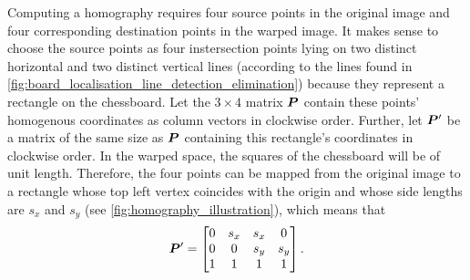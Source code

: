 \documentclass[../report.tex]{subfiles}
\begin{document}
Computing a homography requires four source points in the original image and four corresponding destination points in the warped image.
It makes sense to choose the source points as four instersection points lying on two distinct horizontal and two distinct vertical lines (according to the lines found in \cref{fig:board_localisation_line_detection_elimination}) because they represent a rectangle on the chessboard.
Let the $3 \times 4$ matrix ${\bm{P}}$ contain these points' homogenous coordinates as column vectors in clockwise order.
Further, let ${\bm{P}}'$ be a matrix of the same size as ${\bm{P}}$ containing this rectangle's coordinates in clockwise order.
In the warped space, the squares of the chessboard will be of unit length. 
Therefore, the four points can be mapped from the original image to a rectangle whose top left vertex coincides with the origin and whose side lengths are $s_x$ and $s_y$ (see \cref{fig:homography_illustration}), which means that
\begin{equation*}
    {\bm{P}}' = \begin{bmatrix}
        0 & s_x & s_x & 0 \\
        0 & 0 & s_y & s_y \\
        1 & 1 & 1 & 1
    \end{bmatrix}.
\end{equation*}%
\end{document}
